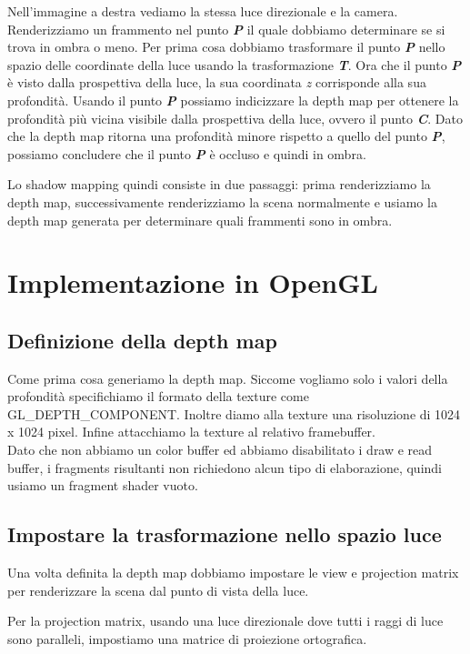\documentclass[12pt]{report}
\begin{document}
Nell’immagine a destra vediamo la stessa luce direzionale e la camera. Renderizziamo un frammento nel punto \textit{\textbf{P}} il quale dobbiamo determinare se si trova in ombra o meno. Per prima cosa dobbiamo trasformare il punto \textit{\textbf{P}} nello spazio delle coordinate della luce usando la trasformazione \textit{\textbf{T}}. Ora che il punto \textit{\textbf{P}} è visto dalla prospettiva della luce, la sua coordinata \textit{z} corrisponde alla sua profondità. Usando il punto \textit{\textbf{P}} possiamo indicizzare la depth map per ottenere la profondità più vicina visibile dalla prospettiva della luce, ovvero il punto \textit{\textbf{C}}. Dato che la depth map ritorna una profondità minore rispetto a quello del punto \textit{\textbf{P}}, possiamo concludere che il punto \textit{\textbf{P}} è occluso e quindi in ombra.

Lo shadow mapping quindi consiste in due passaggi: prima renderizziamo la depth map,  successivamente renderizziamo la scena normalmente e usiamo la depth map generata per determinare quali frammenti sono in ombra.

\chapter{Implementazione in OpenGL}
\section{Definizione della depth map}
Come prima cosa generiamo la depth map. Siccome vogliamo solo i valori della profondità specifichiamo il formato della texture come GL\_DEPTH\_COMPONENT. Inoltre diamo alla texture una risoluzione di 1024 x 1024 pixel. Infine attacchiamo la texture al relativo framebuffer.\\
Dato che non abbiamo un color buffer ed abbiamo disabilitato i draw e read buffer, i fragments risultanti non richiedono alcun tipo di elaborazione, quindi usiamo un fragment shader vuoto.

\section{Impostare la trasformazione nello spazio luce}
Una volta definita la depth map dobbiamo impostare le view e projection matrix per renderizzare la scena dal punto di vista della luce. 

Per la projection matrix, usando una luce direzionale dove tutti i raggi di luce sono paralleli, impostiamo una matrice di proiezione ortografica.
\end{document}
